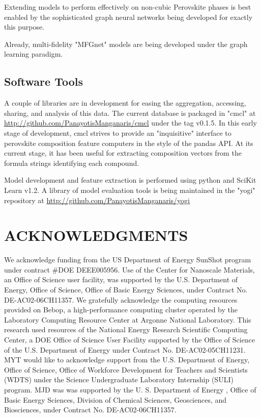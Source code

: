 \documentclass[aip, jmp, amsmath, amssymb]{revtex4-2}
\begin{document}
Extending models to perform effectively on non-cubic Perovskite phases
is best enabled by the sophisticated graph neural networks being
developed for exactly this purpose.

Already, multi-fidelity "MFGnet" models are being developed under the graph
learning paradigm\cite{chen-2020-multi-fidel}.

\subsection*{Software Tools}
\label{sec:orgc42fb15}
A couple of libraries are in development for easing the aggregation,
accessing, sharing, and analysis of this data. The current database is
packaged in "cmcl" at \url{http://github.com/PanayotisManganaris/cmcl} under
the tag v0.1.5. In this early stage of development, cmcl strives to
provide an "inquisitive" interface to perovskite composition feature
computers in the style of the pandas API. At its current stage, it has
been useful for extracting composition vectors from the formula
strings identifying each compound.

Model development and feature extraction is performed using python and
SciKit Learn v1.2. A library of model evaluation tools is being
maintained in the "yogi" repository at
\url{http://github.com/PanayotisManganaris/yogi}

\section*{ACKNOWLEDGMENTS}
\label{sec:org39968d3}
We acknowledge funding from the US Department of Energy SunShot program
under contract \#DOE DEEE005956. Use of the Center for Nanoscale
Materials, an Office of Science user facility, was supported by the U.S.
Department of Energy, Office of Science, Office of Basic Energy
Sciences, under Contract No. DE-AC02-06CH11357. We gratefully
acknowledge the computing resources provided on Bebop, a
high-performance computing cluster operated by the Laboratory Computing
Resource Center at Argonne National Laboratory. This research used
resources of the National Energy Research Scientific Computing Center, a
DOE Office of Science User Facility supported by the Office of Science
of the U.S. Department of Energy under Contract No. DE-AC02-05CH11231.
MYT would like to acknowledge support from the U.S. Department of
Energy, Office of Science, Office of Workforce Development for Teachers
and Scientists (WDTS) under the Science Undergraduate Laboratory
Internship (SULI) program. MJD was was supported by the U. S. Department
of Energy , Office of Basic Energy Sciences, Division of Chemical
Sciences, Geosciences, and Biosciences, under Contract No.
DE-AC02-06CH11357.
\end{document}
